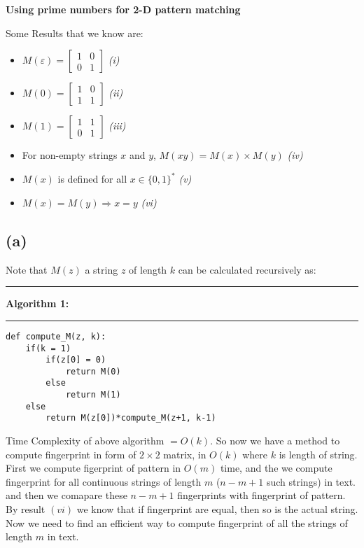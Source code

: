 \documentclass[a4paper]{article}
\begin{document}
\begin{question}
\textbf{Using prime numbers for 2-D pattern matching}
\end{question}
Some Results that we know are:
\begin{itemize}
    \item{$M(\varepsilon) = \begin{bmatrix} 1 & 0 \\ 0 & 1 \end{bmatrix} $ \hfill \textit{(i)}}
    \item{$M(0) = \begin{bmatrix} 1 & 0 \\ 1 & 1 \end{bmatrix} $ \hfill \textit{(ii)}}
    \item{$M(1) = \begin{bmatrix} 1 & 1 \\ 0 & 1 \end{bmatrix} $ \hfill \textit{(iii)}}
    \item{For non-empty strings $x$ and $y$, $M(xy) = M(x) × M(y)$
    \hfill \textit{(iv)}
    }
    \item{$M(x)$ is defined for all $x\in \{0,1\}^{*}$ \hfill \textit{(v)}}
    \item{$M(x) = M(y) \Rightarrow x = y$ \hfill \textit{(vi)}}
\end{itemize}
\subsection*{(a)}
Note that $M(z)$ a string $z$ of length $k$ can be calculated recursively as: \\
\noindent\rule{\textwidth}{0.4pt}
\textbf{Algorithm 1:} \\
\noindent\rule{\textwidth}{0.2pt}
\begin{lstlisting}[columns=fullflexible] 
def compute_M(z, k):    
    if(k = 1)
        if(z[0] = 0)
            return M(0)
        else
            return M(1)
    else
        return M(z[0])*compute_M(z+1, k-1)
\end{lstlisting}
\vspace{1.5em}
Time Complexity of above algorithm $= O(k)$. So now we have a method to compute fingerprint in form of $2 \times 2$ matrix, in $O(k)$ where $k$ is length of string. First we compute figerprint of pattern in $O(m)$ time, and the we compute fingerprint for all continuous strings of length $m$ ($n - m + 1$ such strings) in text. and then we comapare these $n - m + 1$ fingerprints with fingerprint of pattern. By result \textit{$(vi)$} we know that if fingerprint are equal, then so is the actual string. Now we need to find an efficient way to compute fingerprint of all the strings of length $m$ in text.
\end{document}

